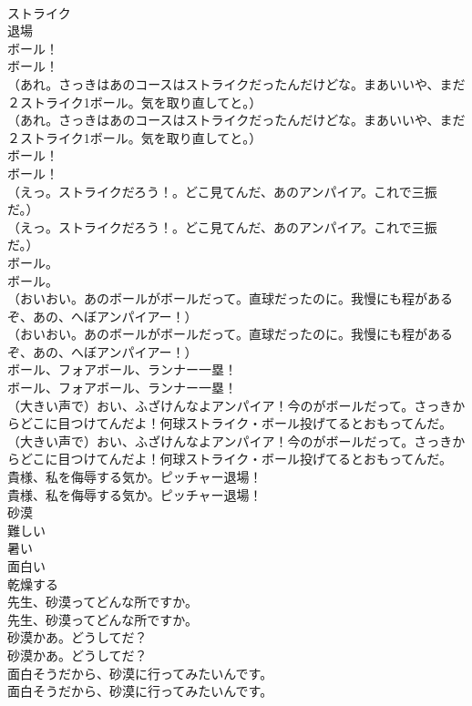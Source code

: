 \documentclass[8pt]{extreport}
\begin{document}
\begin{CJK}{UTF8}{min}
\\	ストライク
\\	退場
\\	ボール！	
\\	ボール！ 
\\	（あれ。さっきはあのコースはストライクだったんだけどな。まあいいや、まだ２ストライク1ボール。気を取り直してと。）	
\\	（あれ。さっきはあのコースはストライクだったんだけどな。まあいいや、まだ２ストライク1ボール。気を取り直してと。） 
\\	ボール！	
\\	ボール！ 
\\	（えっ。ストライクだろう！。どこ見てんだ、あのアンパイア。これで三振だ。）	
\\	（えっ。ストライクだろう！。どこ見てんだ、あのアンパイア。これで三振だ。） 
\\	ボール。	
\\	ボール。 
\\	（おいおい。あのボールがボールだって。直球だったのに。我慢にも程があるぞ、あの、へぼアンパイアー！）	
\\	（おいおい。あのボールがボールだって。直球だったのに。我慢にも程があるぞ、あの、へぼアンパイアー！） 
\\	ボール、フォアボール、ランナー一塁！	
\\	ボール、フォアボール、ランナー一塁！ 
\\	（大きい声で）おい、ふざけんなよアンパイア！今のがボールだって。さっきからどこに目つけてんだよ！何球ストライク・ボール投げてるとおもってんだ。	
\\	（大きい声で）おい、ふざけんなよアンパイア！今のがボールだって。さっきからどこに目つけてんだよ！何球ストライク・ボール投げてるとおもってんだ。 
\\	貴様、私を侮辱する気か。ピッチャー退場！	
\\	貴様、私を侮辱する気か。ピッチャー退場！ 
\\	砂漠
\\	難しい
\\	暑い
\\	面白い
\\	乾燥する
\\	先生、砂漠ってどんな所ですか。	
\\	先生、砂漠ってどんな所ですか。 
\\	砂漠かあ。どうしてだ？	
\\	砂漠かあ。どうしてだ？ 
\\	面白そうだから、砂漠に行ってみたいんです。	
\\	面白そうだから、砂漠に行ってみたいんです。 

\end{CJK}
\end{document}
